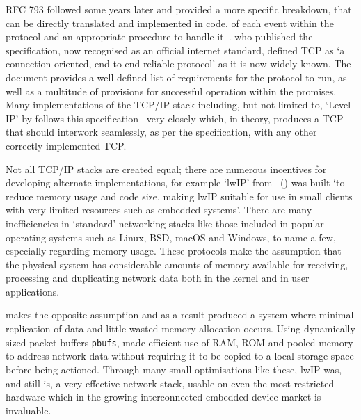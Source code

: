 \documentclass[11pt,a4paper,british]{bhamarticle}
\begin{document}
\begin{multicols}{2}
RFC 793 followed some years later and provided a more specific breakdown, that can be directly translated and implemented in code, of each event within the protocol and an appropriate procedure to handle it~\cite[Page~54-77]{rfc793}. \citeauthor{rfc793} who published the specification, now recognised as an official internet standard, defined TCP as `a connection-oriented, end-to-end reliable protocol' as it is now widely known. The document provides a well-defined list of requirements for the protocol to run, as well as a multitude of provisions for successful operation within the promises.
Many implementations of the TCP/IP stack including, but not limited to, `Level-IP' by \citeauthor{levelip-spec} follows this specification~\cite[\texttt{src/tcp\_input.c} line~262]{levelip-spec} very closely which, in theory, produces a TCP that should interwork seamlessly, as per the specification, with any other correctly implemented TCP. %

Not all TCP/IP stacks are created equal; there are numerous incentives for developing alternate implementations, for example `lwIP' from \citeauthor{lwip}~(\citeyear{lwip}) was built `to reduce memory usage and code size, making lwIP suitable for use in small clients with very limited resources such as embedded systems'. There are many inefficiencies in `standard' networking stacks like those included in popular operating systems such as Linux, BSD, macOS and Windows, to name a few, especially regarding memory usage. These protocols make the assumption that the physical system has considerable amounts of memory available for receiving, processing and duplicating network data both in the kernel and in user applications.

\citeauthor{lwip} makes the opposite assumption and as a result produced a system where minimal replication of data and little wasted memory allocation occurs. Using dynamically sized packet buffers \texttt{pbufs}, \citeauthor{lwip} made efficient use of RAM, ROM and pooled memory to address network data without requiring it to be copied to a local storage space before being actioned. Through many small optimisations like these, lwIP was, and still is, a very effective network stack, usable on even the most restricted hardware which in the growing interconnected embedded device market is invaluable.


\end{multicols}
\end{document}
